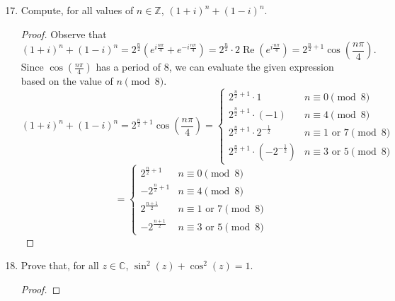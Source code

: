 \documentclass[10pt]{article}
\newcommand{\Z}{\mathbb{Z}}
\newcommand{\C}{\mathbb{C}}
\DeclareMathOperator*{\re}{Re}
\begin{document}
\begin{enumerate}
\setcounter{enumi}{16}













\item Compute, for all values of $n \in \Z$, $(1+i)^n + (1-i)^n$.

\begin{proof}

Observe that
$$
(1+i)^n + (1-i)^n
= 2^{\frac{n}{2}}( e^{i\frac{n\pi}{4}} + e^{-i\frac{n\pi}{4}})
= 2^{\frac{n}{2}} \cdot 2 \re (e^{i\frac{n\pi}{4}})
= 2^{\frac{n}{2} + 1} \cos \left( \frac{n\pi}{4} \right).
$$
Since $\cos \left( \frac{n\pi}{4} \right)$ has a period of $8$, we can evaluate the given expression based on the value of $n \pmod{8}$.
$$
(1+i)^n + (1-i)^n
=
2^{\frac{n}{2} + 1} \cos \left( \frac{n\pi}{4} \right)
=
\begin{cases}
2^{\frac{n}{2} + 1} \cdot 1 & n \equiv 0 \pmod{8} \\
2^{\frac{n}{2} + 1} \cdot (-1) & n \equiv 4 \pmod{8} \\
2^{\frac{n}{2} + 1} \cdot 2^{-\frac12} & n \equiv 1 \text{ or } 7 \pmod{8} \\
2^{\frac{n}{2} + 1} \cdot (-2^{-\frac12}) & n \equiv 3 \text{ or } 5 \pmod{8}
\end{cases}
$$
$$
=
\begin{cases}
2^{\frac{n}{2} + 1} & n \equiv 0 \pmod{8} \\
-2^{\frac{n}{2} + 1} & n \equiv 4 \pmod{8} \\
2^{\frac{n+1}{2}} & n \equiv 1 \text{ or } 7 \pmod{8} \\
-2^{\frac{n+1}{2}} & n \equiv 3 \text{ or } 5 \pmod{8}
\end{cases}
$$
\end{proof}












\item Prove that, for all $z \in \C$, $\sin^2(z) + \cos^2(z) = 1$.

\begin{proof}


\end{proof}
\end{enumerate}
\end{document}
